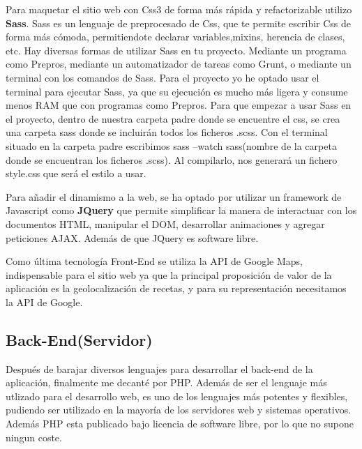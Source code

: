 \vspace{5 mm}

Para maquetar el sitio web con Css3 de forma más rápida y refactorizable utilizo \textbf{Sass}. Sass es un lenguaje de preprocesado de Css, que te permite escribir Css de forma más cómoda, permitiendote declarar variables,mixins, herencia de clases, etc. Hay diversas formas de utilizar Sass en tu proyecto. Mediante un programa como Prepros, mediante un automatizador de tareas como Grunt, o mediante un terminal con los comandos de Sass. Para el proyecto yo he optado usar el terminal para ejecutar Sass, ya que su ejecución es mucho más ligera y consume menos RAM que con programas como Prepros. Para que empezar a usar Sass en el proyecto, dentro de nuestra carpeta padre donde se encuentre el css, se crea una carpeta sass donde se incluirán todos los ficheros .scss. Con el terminal situado en la carpeta padre escribimos sass --watch sass(nombre de la carpeta donde se encuentran los ficheros .scss). Al compilarlo, nos generará un fichero style.css que será el estilo a usar.

\vspace{5 mm}

Para añadir el dinamismo a la web, se ha optado por utilizar un framework de Javascript como \textbf{JQuery} que permite simplificar la manera de interactuar con los documentos HTML, manipular el DOM, desarrollar animaciones y agregar peticiones AJAX. Además de que JQuery es software libre.

\vspace{5 mm}

Como última tecnología Front-End se utiliza la API de Google Maps, indispensable para el sitio web ya que la principal proposición de valor de la aplicación es la geolocalización de recetas, y para su representación necesitamos la API de Google.


\subsection{Back-End(Servidor)}

Después de barajar diversos lenguajes para desarrollar el back-end de la aplicación, finalmente me decanté por PHP. Además de ser el lenguaje más utlizado para el desarrollo web, es uno de los lenguajes más potentes y flexibles, pudiendo ser utilizado en la mayoría de los servidores web y sistemas operativos. Además PHP esta publicado bajo licencia de software libre, por lo que no supone ningun coste.


